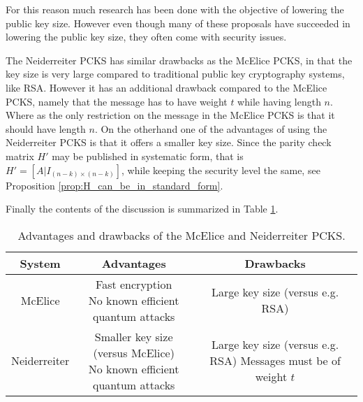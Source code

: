 For this reason much research has been done with the objective of lowering the public key size. However even though many of these proposals have succeeded in lowering the public key size, they often come with security issues.

The Neiderreiter PCKS has similar drawbacks as the McElice PCKS, in that the key size is very large compared to traditional public key cryptography systems, like RSA. However it has an additional drawback compared to the McElice PCKS, namely that the message has to have weight $t$ while having length $n$. Where as the only restriction on the message in the McElice PCKS is that it should have length $n$. On the otherhand one of the advantages of using the Neiderreiter PCKS is that it offers a smaller key size. Since the parity check matrix $H'$ may be published in systematic form, that is $H' = [A | I_{(n - k) \times (n - k)}]$, while keeping the security level the same, see Proposition \ref{prop:H_can_be_in_standard_form}.

Finally the contents of the discussion is summarized in Table \ref{tab:pros_and_cons}.
\begin{table}[H]
    \centering
    \begin{tabular} {||c|c|c||}
        \hline
        \textbf{System} & \textbf{Advantages} & \textbf{Drawbacks} \\
        \hline
        McElice & \makecell{Fast encryption\\No known efficient quantum attacks}& Large key size (versus e.g. RSA) \\
        \hline

        Neiderreiter & \makecell{Smaller key size (versus McElice) \\ No known efficient quantum attacks} & \makecell{Large key size (versus e.g. RSA)\\ Messages must be of weight $t$}\\
        \hline
    \end{tabular}
    \caption{Advantages and drawbacks of the McElice and Neiderreiter PCKS.}
    \label{tab:pros_and_cons}
\end{table}
